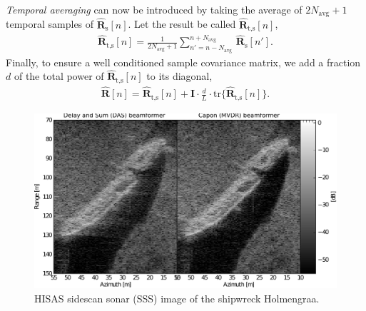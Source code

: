 \documentclass[10pt,a4paper]{article}
\newcommand\tr{\text{tr}}
\newcommand\sumb[2]{\sum\limits_{#1}^{#2}\,}
\newcommand\mat[1]{\boldsymbol{#1}}
\newcommand\1{\vec 1}
\newcommand\I{\mat I}
\newcommand*\eR{\mat{\hat R}}
\renewcommand\gls[1]{#1}
\begin{document}
\emph{Temporal averaging} can now be introduced by taking the average of $2N_\text{avg}+1$ temporal samples of $\eR_\text{s}[n]$. Let the result be called $\eR_\text{t,s}[n]$,
\begin{gather}
\eR_\text{t,s}[n] = \frac{1}{2N_\text{avg}+1} \sumb{n'=n-N_\text{avg}}{n+N_\text{avg}} \eR_\text{s}[n'].
\end{gather}
Finally, to ensure a well conditioned sample covariance matrix, we add a fraction $d$ of the total power of $\eR_\text{t,s}[n]$ to its diagonal\cite{Synnevag2007},
\begin{align}
\eR[n] = \eR_\text{t,s}[n] + \I \cdot \frac{d}{L} \cdot \tr\{\eR_\text{t,s}[n]\}.\label{finalR}
\end{align}



   
\newpage
\begin{figure}[!t]
\centering
\includegraphics[width=\linewidth]{gfx/img_holmengraa.pdf}
\caption{HISAS sidescan sonar (SSS) image of the shipwreck Holmengraa.}\label{holmengraa}
\end{figure}
\end{document}
